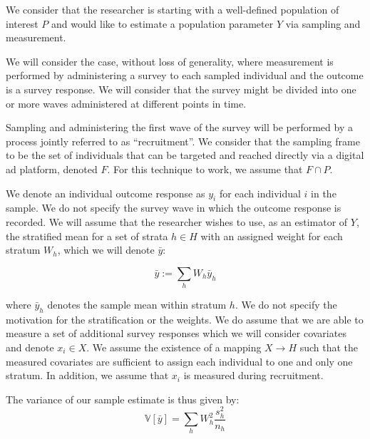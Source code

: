 \documentclass[a4paper,12pt]{article}
\theoremstyle{proposition}
\begin{document}
We consider that the researcher is starting with a well-defined population of interest $P$ and would like to estimate a population parameter $Y$ via sampling and measurement.

We will consider the case, without loss of generality, where measurement is performed by administering a survey to each sampled individual and the outcome is a survey response. We will consider that the survey might be divided into one or more waves administered at different points in time.

Sampling and administering the first wave of the survey will be performed by a process jointly referred to as ``recruitment''. We consider that the sampling frame to be the set of individuals that can be targeted and reached directly via a digital ad platform, denoted $F$. For this technique to work, we assume that $F \cap P$.

We denote an individual outcome response as $y_i$ for each individual $i$ in the sample. We do not specify the survey wave in which the outcome response is recorded. We will assume that the researcher wishes to use, as an estimator of $Y$, the stratified mean for a set of strata $h \in H$ with an assigned weight for each stratum $W_h$, which we will denote $\bar{y}$:

$$
\bar{y} := \sum_h W_h\bar{y}_h
$$

where $\bar{y}_h$ denotes the sample mean within stratum $h$. We do not specify the motivation for the stratification or the weights. We do assume that we are able to measure a set of additional survey responses which we will consider covariates and denote $x_i \in X$. We assume the existence of a mapping $X \rightarrow H$ such that the measured covariates are sufficient to assign each individual to one and only one stratum. In addition, we assume that $x_i$ is measured during recruitment.







The variance of our sample estimate is thus given by:
$$
\mathbb{V}[\bar{y}] =  \sum_{h}  W_h^2 \frac{s_h^2}{n_h}
$$
\end{document}
